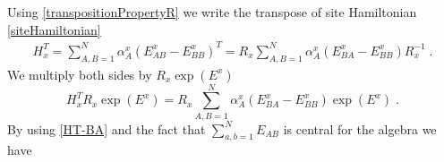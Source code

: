 \documentclass[10pt]{article}
\numberwithin{equation}{section}
\numberwithin{equation}{subsection}
\newcommand{\dt}{\;.}
\begin{document}
Using \eqref{transpositionPropertyR} we write the transpose of site Hamiltonian \eqref{siteHamiltonian} 
\begin{equation}
    \begin{split}
H_{x}^{T}=\sum_{A,B=1}^{N}\alpha_{A}^{x}\left(E_{AB}^{x}-E_{BB}^{x}\right)^{T}=R_{x}\sum_{A,B=1}^{N}\alpha_{A}^{x}\left(E_{BA}^{x}-E_{BB}^{x}\right)R_{x}^{-1}\dt
    \end{split}
\end{equation}
We multiply both sides by $R_{x}\exp{(E^{x})}$
\begin{equation}\label{intermediateTransposeSite}
    H_{x}^{T}R_{x}\exp{(E^{x})}=R_{x}\sum_{A,B =1}^{N}\alpha_{A}^{x}\left(E_{B A}^{x}-E_{BB}^{x}\right)\exp{(E^{x})}\dt
\end{equation}
By using \eqref{HT-BA} and the fact that 
$\sum_{a,b=1}^{N}E_{AB}$ is central for the algebra we have 
\end{document}
